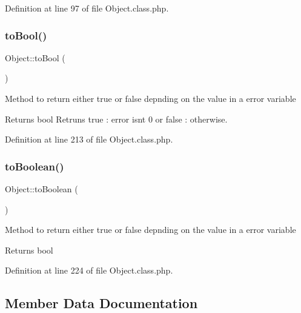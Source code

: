 Definition at line 97 of file Object.\+class.\+php.

\hypertarget{classObject_a409216fd5ab386b1e78e311440113f75}{}\label{classObject_a409216fd5ab386b1e78e311440113f75} 
\subsubsection{\texorpdfstring{to\+Bool()}{toBool()}}
{\footnotesize\ttfamily Object\+::to\+Bool (\begin{DoxyParamCaption}{ }\end{DoxyParamCaption})}

Method to return either true or false depnding on the value in a \textquotesingle{}error\textquotesingle{} variable

\begin{DoxyReturn}{Returns}
bool Retruns true \+: error isn\textquotesingle{}t 0 or false \+: otherwise. 
\end{DoxyReturn}


Definition at line 213 of file Object.\+class.\+php.

\hypertarget{classObject_afafb45098e163c179940c7e1ddc67fe2}{}\label{classObject_afafb45098e163c179940c7e1ddc67fe2} 
\subsubsection{\texorpdfstring{to\+Boolean()}{toBoolean()}}
{\footnotesize\ttfamily Object\+::to\+Boolean (\begin{DoxyParamCaption}{ }\end{DoxyParamCaption})}

Method to return either true or false depnding on the value in a \textquotesingle{}error\textquotesingle{} variable

\begin{DoxyReturn}{Returns}
bool 
\end{DoxyReturn}


Definition at line 224 of file Object.\+class.\+php.



\subsection{Member Data Documentation}
\hypertarget{classObject_a891a586df36cca119a56bb509f582858}{}\label{classObject_a891a586df36cca119a56bb509f582858} 
